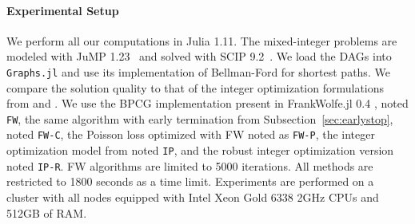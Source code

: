 \documentclass{ecai}
\newcommand{\vvv}{\mathbf{v}}
\newcommand{\vw}{\mathbf{w}}
\newcommand{\Z}{\mathbb{Z}}
\newcommand{\interval}[1]{ [\![  #1 ]\!]}
\begin{document}


\paragraph*{Experimental Setup\\}
We perform all our computations in Julia 1.11.
The mixed-integer problems are modeled with JuMP 1.23~\cite{lubin2023jump} and solved with SCIP 9.2~\cite{bolusani2024scip}.
We load the DAGs into \texttt{Graphs.jl} and use its implementation of Bellman-Ford for shortest paths.
We compare the solution quality to that of the integer optimization formulations from \cite{dias2022efficient} and \cite{dias2024accurate}.
We use the BPCG implementation present in FrankWolfe.jl 0.4 \cite{besanccon2022frankwolfe,besanccon2025improved}, noted \texttt{FW},
the same algorithm with early termination from Subsection~\ref{sec:earlystop}, noted \texttt{FW-C},
the Poisson loss optimized with FW noted as \texttt{FW-P},
the integer optimization model from \cite{dias2022efficient} noted \texttt{IP}, and the robust integer optimization version noted \texttt{IP-R}.
FW algorithms are limited to 5000 iterations.
All methods are restricted to 1800 seconds as a time limit.
Experiments are performed on a cluster with all nodes equipped with Intel Xeon Gold 6338 2GHz CPUs and 512GB of RAM.
\end{document}

